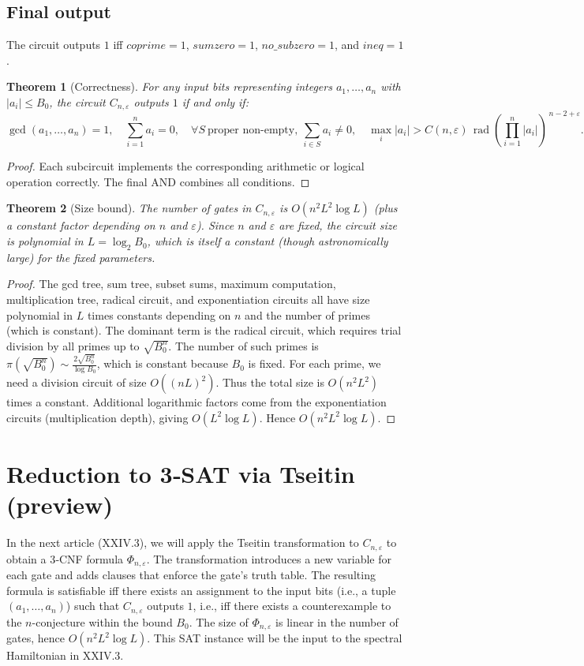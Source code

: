 \documentclass[11pt,a4paper]{article}
\newtheorem{theorem}{Theorem}[section]
\begin{document}
\subsection{Final output}
The circuit outputs $1$ iff $coprime = 1$, $sumzero = 1$, $no\_subzero = 1$, and $ineq = 1$.

\begin{theorem}[Correctness]
\label{thm:correct}
For any input bits representing integers $a_1,\dots,a_n$ with $|a_i|\le B_0$, the circuit $C_{n,\varepsilon}$ outputs $1$ if and only if:
\[
\gcd(a_1,\dots,a_n)=1,\quad \sum_{i=1}^n a_i=0,\quad \forall S\ \text{proper non‑empty},\ \sum_{i\in S}a_i\neq0,\quad \max_i|a_i| > C(n,\varepsilon)\,\operatorname{rad}\!\left(\prod_{i=1}^n |a_i|\right)^{\,n-2+\varepsilon}.
\]
\end{theorem}
\begin{proof}
Each subcircuit implements the corresponding arithmetic or logical operation correctly. The final AND combines all conditions.
\end{proof}

\begin{theorem}[Size bound]
\label{thm:size}
The number of gates in $C_{n,\varepsilon}$ is $O(n^2 L^2 \log L)$ (plus a constant factor depending on $n$ and $\varepsilon$). Since $n$ and $\varepsilon$ are fixed, the circuit size is polynomial in $L = \log_2 B_0$, which is itself a constant (though astronomically large) for the fixed parameters.
\end{theorem}
\begin{proof}
The gcd tree, sum tree, subset sums, maximum computation, multiplication tree, radical circuit, and exponentiation circuits all have size polynomial in $L$ times constants depending on $n$ and the number of primes (which is constant). The dominant term is the radical circuit, which requires trial division by all primes up to $\sqrt{B_0^n}$. The number of such primes is $\pi(\sqrt{B_0^n}) \sim \frac{2\sqrt{B_0^n}}{\log B_0}$, which is constant because $B_0$ is fixed. For each prime, we need a division circuit of size $O((nL)^2)$. Thus the total size is $O(n^2 L^2)$ times a constant. Additional logarithmic factors come from the exponentiation circuits (multiplication depth), giving $O(L^2 \log L)$. Hence $O(n^2 L^2 \log L)$.
\end{proof}

\section{Reduction to 3‑SAT via Tseitin (preview)}
In the next article (XXIV.3), we will apply the Tseitin transformation to $C_{n,\varepsilon}$ to obtain a 3‑CNF formula $\Phi_{n,\varepsilon}$. The transformation introduces a new variable for each gate and adds clauses that enforce the gate’s truth table. The resulting formula is satisfiable iff there exists an assignment to the input bits (i.e., a tuple $(a_1,\dots,a_n)$) such that $C_{n,\varepsilon}$ outputs $1$, i.e., iff there exists a counterexample to the $n$-conjecture within the bound $B_0$. The size of $\Phi_{n,\varepsilon}$ is linear in the number of gates, hence $O(n^2 L^2 \log L)$. This SAT instance will be the input to the spectral Hamiltonian in XXIV.3.
\end{document}
